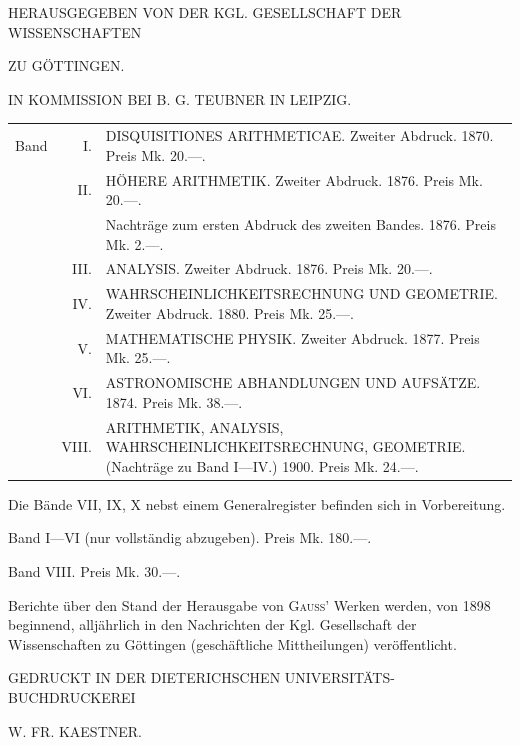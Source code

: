 \clearpage{}
\begin{center}
{\Large{}}\par\medskip
HERAUSGEGEBEN VON DER KGL. GESELLSCHAFT DER WISSENSCHAFTEN\par
ZU GÖTTINGEN.\par\medskip
IN KOMMISSION BEI B. G. TEUBNER IN LEIPZIG.
\end{center}

\noindent\begin{tabular}{@{}l@{\quad}r@{\quad}p{.84\linewidth}@{}}
Band&I.&DISQUISITIONES ARITHMETICAE. Zweiter Abdruck. 1870. Preis Mk. 20.—.\\[.3em]
&II.&HÖHERE ARITHMETIK. Zweiter Abdruck. 1876. Preis Mk. 20.—.\\[.3em]
&&Nachträge zum ersten Abdruck des zweiten Bandes. 1876. Preis Mk. 2.—.\\[.3em]
&III.&ANALYSIS. Zweiter Abdruck. 1876. Preis Mk. 20.—.\\[.3em]
&IV.&WAHRSCHEINLICHKEITSRECHNUNG UND GEOMETRIE. Zweiter Abdruck. 1880. Preis Mk. 25.—.\\[.3em]
&V.&MATHEMATISCHE PHYSIK. Zweiter Abdruck. 1877. Preis Mk. 25.—.\\[.3em]
&VI.&ASTRONOMISCHE ABHANDLUNGEN UND AUFSÄTZE. 1874. Preis Mk. 38.—.\\[.3em]
&VIII.&ARITHMETIK, ANALYSIS, WAHRSCHEINLICHKEITSRECHNUNG, GEOMETRIE. (Nachträge zu Band I—IV.) 1900. Preis Mk. 24.—.
\end{tabular}

\medskip\noindent Die Bände VII, IX, X nebst einem Generalregister befinden sich in Vorbereitung.

\noindent Band I—VI (nur vollständig abzugeben). Preis Mk. 180.—.\par
\noindent Band VIII. Preis Mk. 30.—.

\bigskip
Berichte über den Stand der Herausgabe von \textsc{Gauss}' Werken werden, von 1898 beginnend, alljährlich in den Nachrichten der Kgl. Gesellschaft der Wissenschaften zu Göttingen (geschäftliche Mittheilungen) veröffentlicht.

\bigskip\begin{center}
{\large{}}\par\medskip
GEDRUCKT IN DER DIETERICHSCHEN UNIVERSITÄTS-BUCHDRUCKEREI\par\medskip
W. FR. KAESTNER.
\end{center}
